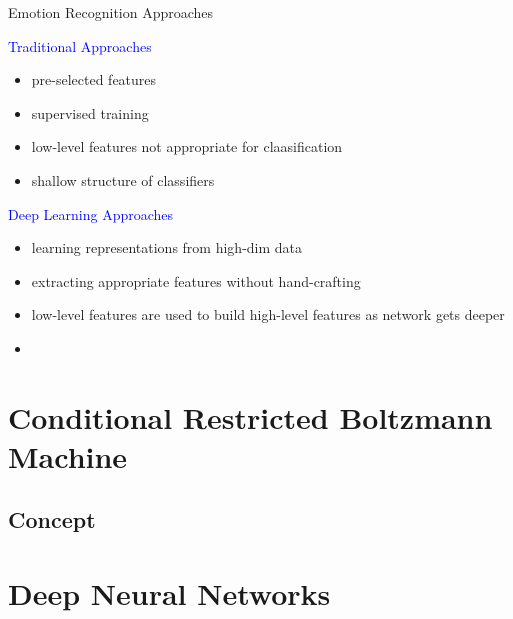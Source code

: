 \begin{frame}[t]{Emotion Recognition Approaches}
	\begin{minipage}[t]{0.48\linewidth}
	  \textcolor{blue}{\Large Traditional Approaches}
	  \begin{itemize}
	   \item pre-selected features
	   \item supervised training
	   \item low-level features not appropriate for claasification
	   \item shallow structure of classifiers
	  \end{itemize}
	\end{minipage}
	\begin{minipage}[t]{0.48\linewidth}
	\textcolor{blue}{\Large Deep Learning Approaches}
	  \begin{itemize}
	   \item learning representations from high-dim data
	   \item extracting appropriate features without hand-crafting
	   \item low-level features are used to build high-level features as network gets deeper
	   \item 
	  \end{itemize}

	\end{minipage}

\end{frame}


\section{Conditional Restricted Boltzmann Machine}
	\subsection{Concept}
		\begin{minipage}{0.48\linewidth}
		 
		\end{minipage}

  
\section{Deep Neural Networks}%
